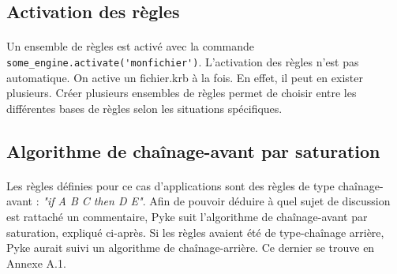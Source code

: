 \documentclass {report}
\begin{document}
\subsection{Activation des règles}
\paragraph{}
Un ensemble de règles est activé avec la commande \verb+some_engine.activate('monfichier')+. L'activation des règles n'est pas automatique. On active un fichier.krb à la fois. En effet, il peut en exister plusieurs. Créer plusieurs ensembles de règles permet de choisir entre les différentes bases de règles selon les situations spécifiques.

\subsection{Algorithme de chaînage-avant par saturation}
\paragraph{}
Les règles définies pour ce cas d'applications sont des règles de type chaînage-avant : \textit{"if A B C then D E"}. Afin de pouvoir déduire à quel sujet de discussion est rattaché un commentaire, Pyke suit l'algorithme de chaînage-avant par saturation, expliqué ci-après. Si les règles avaient été de type-chaînage arrière, Pyke aurait suivi un algorithme de chaînage-arrière. Ce dernier se trouve en Annexe A.1.
\end{document}
